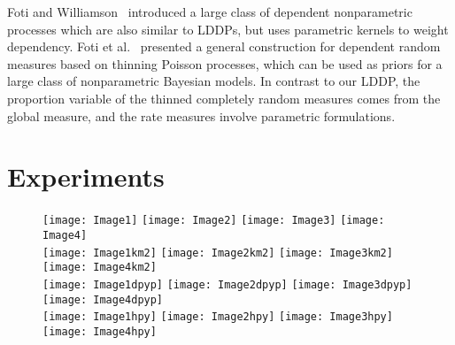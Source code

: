 \documentclass[runningheads,a4paper]{iscide}
\begin{document}
Foti and Williamson~\cite{Foti12SS} introduced a large class of dependent nonparametric
processes which are also similar to LDDPs, but uses parametric kernels
to weight dependency. Foti et al.~\cite{Foti13UP} presented a general
construction for dependent random measures based on thinning Poisson
processes, which can be used as priors for  a large class of
nonparametric Bayesian models. In contrast to our LDDP, the
proportion variable of the thinned completely random measures comes
from the global measure, and the rate measures involve parametric
formulations.

\section{Experiments}
\begin{figure}[!hp]%
\begin{center}
 \texttt{[image: Image1]}
 \texttt{[image: Image2]}
 \texttt{[image: Image3]}
 \texttt{[image: Image4]}\\  %
 \texttt{[image: Image1km2]}
 \texttt{[image: Image2km2]}
 \texttt{[image: Image3km2]}
 \texttt{[image: Image4km2]}\\

  \texttt{[image: Image1dpyp]}
 \texttt{[image: Image2dpyp]}
 \texttt{[image: Image3dpyp]}
 \texttt{[image: Image4dpyp]}\\

 \texttt{[image: Image1hpy]}
 \texttt{[image: Image2hpy]}
 \texttt{[image: Image3hpy]}
 \texttt{[image: Image4hpy]}\\  %


\end{center}
\end{figure}
\end{document}
